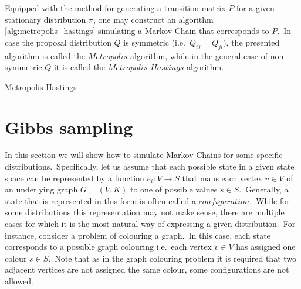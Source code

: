 \documentclass[a4paper, 11pt, onecolumn, openany, titlepage]{report}
\theoremstyle{default_theorem_style}\newtheorem{theorem}{Theorem}
\theoremstyle{default_theorem_style}\newtheorem{definition}{Definition}
\begin{document}
Equipped with the method for generating a transition matrix $P$ for a given stationary distribution $\pi$, one may
construct an algorithm \ref{alg:metropolis_hastings} simulating a Markov Chain that corresponds to $P$.\ In case the
proposal distribution $Q$ is symmetric (i.e.\ $Q_{ij} = Q_{ji}$), the presented algorithm is called the $Metropolis$
algorithm, while in the general case of non-symmetric $Q$ it is called the $Metropolis$-$Hastings$ algorithm.\newline


\begin{algorithm}[tb]
\caption{Metropolis-Hastings}\label{alg:metropolis_hastings}
\begin{algorithmic}[1]
\Else
\EndIf
{}
\end{algorithmic}
\end{algorithm}

\section{Gibbs sampling}\label{section:gibbs_sampling}

In this section we will show how to simulate Markov Chains for some specific distributions.\ Specifically, let us assume
that each possible state in a given state space can be represented by a function $e_i : V \to S$ that maps each vertex
$v \in V$ of an underlying graph $G = (V, K)$ to one of possible values $s \in S$.\ Generally, a state that is
represented in this form is often called a $configuration$.\ While for some distributions this
representation may not make sense, there are multiple cases for which it is the most natural way of expressing a
given distribution.\ For instance, consider a problem of colouring a graph.\ In this case, each state corresponds to a
possible graph colouring i.e.\ each vertex $v \in V$ has assigned one colour $s \in S$.\ Note that as in the graph
colouring problem it is required that two adjacent vertices are not assigned the same colour, some configurations
are not allowed.\newline
\end{document}
